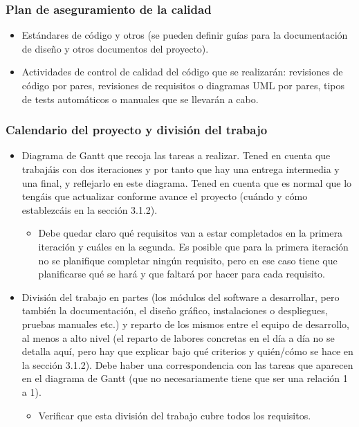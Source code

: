 \documentclass[12pt]{article}%
\begin{document}
\subsubsection{Plan de aseguramiento de la calidad}

\begin{itemize}
	\item Est\'andares de c\'odigo y otros (se pueden definir gu\'ias para la documentaci\'on de dise\~no y otros documentos del proyecto).
	\item Actividades de control de calidad del c\'odigo que se realizar\'an: revisiones de c\'odigo por pares, revisiones de requisitos o diagramas UML por pares, tipos de tests autom\'aticos o manuales que se llevar\'an a cabo.
\end{itemize}

\subsubsection{Calendario del proyecto y divisi\'on del trabajo}
\begin{itemize}
	\item Diagrama de Gantt que recoja las tareas a realizar. Tened en cuenta que trabaj\'ais con dos iteraciones y por tanto que hay una entrega intermedia y una final, y reflejarlo en este diagrama. Tened en cuenta que es normal que lo teng\'ais que actualizar conforme avance el proyecto (cu\'ando y c\'omo establezc\'ais en la secci\'on 3.1.2).
	\begin{itemize}
		\item Debe quedar claro qu\'e requisitos van a estar completados en la primera iteraci\'on y cu\'ales en la segunda. Es posible que para la primera iteraci\'on no se planifique completar ning\'un requisito, pero en ese caso tiene que planificarse qu\'e se har\'a y que faltar\'a por hacer para cada requisito.
	\end{itemize}
	\item Divisi\'on del trabajo en partes (los m\'odulos del software a desarrollar, pero tambi\'en  la documentaci\'on, el dise\~no gr\'afico, instalaciones o despliegues, pruebas manuales etc.) y reparto de los mismos entre el equipo de desarrollo, al menos a alto nivel (el reparto de labores concretas en el d\'ia a d\'ia no se detalla aqu\'i, pero hay que explicar bajo qu\'e criterios y qui\'en/c\'omo se hace en la secci\'on 3.1.2). Debe haber una correspondencia con las tareas que aparecen en el diagrama de Gantt (que no necesariamente tiene que ser una relaci\'on 1 a 1).
	\begin{itemize}
		\item Verificar que esta divisi\'on del trabajo cubre todos los requisitos.
	\end{itemize}
\end{itemize}
\end{document}
